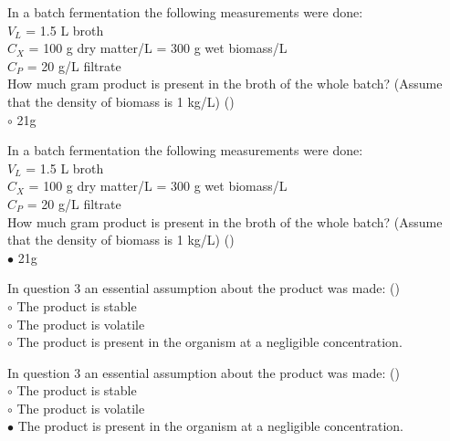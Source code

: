 \documentclass[]{beamer}
\begin{document}
\begin{frame}[shrink] {}
\addtocounter{questions}{1}
\color{blue}
In a batch fermentation the following measurements were done: \\
\color{gray}
$V_L$ = 1.5 L broth  \\
$C_X$ = 100 g dry matter/L = 300 g wet biomass/L \\
$C_P$ = 20 g/L filtrate \\
\color{blue}
How much gram product is present in the broth of the whole batch?
(Assume that the density of biomass is 1 kg/L) ()\\
\color{black}
{\color{red}$\circ$} 21g \\
\end{frame}
\begin{frame}[shrink] {}
\addtocounter{answers}{1}
\color{blue}
In a batch fermentation the following measurements were done: \\
\color{gray}
$V_L$ = 1.5 L broth  \\
$C_X$ = 100 g dry matter/L = 300 g wet biomass/L \\
$C_P$ = 20 g/L filtrate \\
\color{blue}
How much gram product is present in the broth of the whole batch?
(Assume that the density of biomass is 1 kg/L) ()\\
\color{black}
{\color{red}$\bullet$} 21g \\
\end{frame}

\begin{frame}[shrink] {}
\addtocounter{questions}{1}
\color{blue}
In question 3 an essential assumption about the product was made: ()\\
\color{black}
\setlength{\parindent}{-0.4cm}
{\color{red}$\circ$}  The product is stable \\
{\color{red}$\circ$} The product is volatile \\
{\color{red}$\circ$} The product is present in the organism at a negligible concentration.  \\
\end{frame}
\begin{frame}[shrink] {}
\addtocounter{answers}{1}
\color{blue}
In question 3 an essential assumption about the product was made: ()\\
\color{black}
\setlength{\parindent}{-0.4cm}
{\color{red}$\circ$}  The product is stable \\
{\color{red}$\circ$} The product is volatile \\
{\color{red}$\bullet$} The product is present in the organism at a negligible concentration.  \\
\end{frame}
\end{document}
